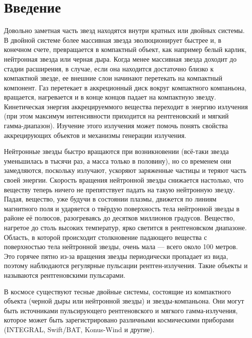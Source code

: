 
\section*{Введение}

	
	Довольно заметная часть звезд находятся внутри кратных или двойных системы. В двойной системе более массивная звезда эволюционирует быстрее и, в конечном счете, превращается в компактный объект, как например белый карлик, нейтронная звезда или черная дыра. Когда менее массивная звезда доходит до стадии расширения, в случае, если она находится достаточно близко к компактной звезде, ее внешние слои начинают перетекать на компактный компонент. Газ перетекает в аккреционный диск вокруг компактного компаньона, вращается, нагревается и в конце концов падает на компактную звезду. Кинетическая энергия аккрецируеммого вещества переходит в энергию излучения (при этом максимум интенсивности приходится на рентгеновский и мягкий гамма-диапазон). Изучение этого излучения может помочь понять свойства аккрецирующих объектов и механизмы генерации излучения.

	Нейтронные звезды быстро вращаются при возникновении (всё-таки звезда уменьшилась в тысячи раз, а масса только в половину), но со временем они замедляются, поскольку излучают, ускоряют заряженные частицы и теряют часть своей энергии. Скорость вращения нейтронной звезды снижается настолько, что веществу теперь ничего не препятствует падать на такую нейтронную звезду. Падая, вещество, уже будучи в состоянии плазмы, движется по линиям магнитного поля и ударяется о твёрдую поверхность тела нейтронной звезды в районе её полюсов, разогреваясь до десятков миллионов градусов. Вещество, нагретое до столь высоких температур, ярко светится в рентгеновском диапазоне. Область, в которой происходит столкновение падающего вещества с поверхностью тела нейтронной звезды, очень мала — всего около 100 метров. Это горячее пятно из-за вращения звезды периодически пропадает из вида, поэтому наблюдаются регулярные пульсации рентген-излучения. Такие объекты и называются рентгеновскими пульсарами. 	
	
	В космосе существуют тесные двойные системы, состоящие из компактного объекта (черной дыры или нейтронной звезды) и звезды-компаньона. Они могут быть источниками пульсирующего рентгеновского и мягкого гамма-излучения, которое может быть зарегистрировано различными космическими приборами (INTEGRAL, Swift/BAT, Konus-Wind и другие).
	
